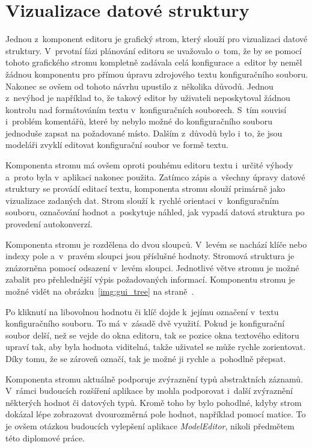 \documentclass[FM,bw,DP]{tulthesis}
\begin{document}
\section{Vizualizace datové struktury}

Jednou z~komponent editoru je grafický strom, který slouží pro vizualizaci datové struktury. V~prvotní fázi plánování editoru se uvažovalo o~tom, že by se pomocí tohoto grafického stromu kompletně zadávala celá konfigurace a~editor by neměl žádnou komponentu pro přímou úpravu zdrojového textu konfiguračního souboru. Nakonec se ovšem od tohoto návrhu upustilo z~několika důvodů. Jednou z~nevýhod je například to, že takový editor by uživateli neposkytoval žádnou kontrolu nad formátováním textu v~konfiguračních souborech. S~tím souvisí i~problém komentářů, které by nebylo možné do konfiguračního souboru jednoduše zapsat na požadované místo. Dalším z~důvodů bylo i~to, že jsou modeláři zvyklí editovat konfigurační soubor ve formě textu.

Komponenta stromu má ovšem oproti pouhému editoru textu i~určité výhody a~proto byla v~aplikaci nakonec použita. Zatímco zápis a~všechny úpravy datové struktury se provádí editací textu, komponenta stromu slouží primárně jako vizualizace zadaných dat. Strom slouží k~rychlé orientaci v~konfiguračním souboru, označování hodnot a~poskytuje náhled, jak vypadá datová struktura po provedení autokonverzí.

Komponenta stromu je rozdělena do dvou sloupců. V~levém se nachází klíče nebo indexy pole a~v~pravém sloupci jsou příslušné hodnoty. Stromová struktura je znázorněna pomocí odsazení v~levém sloupci. Jednotlivé větve stromu je možné zabalit pro přehlednější výpis požadovaných informací. Komponentu stromu je možné vidět na obrázku~\ref{img:gui_tree} na straně~\pageref{img:gui_tree}.

Po kliknutí na libovolnou hodnotu či klíč dojde k~jejímu označení v~textu konfiguračního souboru. To má v~zásadě dvě využití. Pokud je konfigurační soubor delší, než se vejde do okna editoru, tak se pozice okna textového editoru upraví tak, aby byla hodnota viditelná, takže uživatel se může rychle zorientovat. Díky tomu, že se zároveň označí, tak je možné ji rychle a~pohodlně přepsat.

Komponenta stromu aktuálně podporuje zvýraznění typů abstraktních záznamů. V~rámci budoucích rozšíření aplikace by mohla podporovat i~další zvýraznění někte\-rých hodnot či datových typů. Kromě toho by bylo pohodlné, kdyby strom dokázal lépe zobrazovat dvourozměrná pole hodnot, například pomocí matice. To je ovšem otázkou budoucích vylepšení aplikace \textit{ModelEditor}, nikoli předmětem této diplomové práce.
\end{document}
